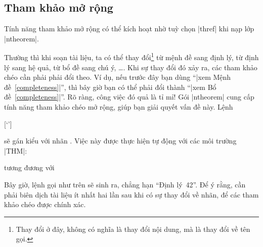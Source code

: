 \begin{theorem}
\begin{thm}
\subsection{Tham khảo mở rộng}

Tính năng tham khảo mở rộng có thể kích hoạt nhờ tuỳ chọn
|thref| khi nạp lớp |ntheorem|.

\medskip
Thường thì khi soạn tài liệu, ta có thể thay đổi\footnote{Thay đổi ở đây,
không có nghĩa là thay đổi nội dung, mà là thay đổi về tên gọi.}
từ mệnh đề
sang định lý, từ định lý sang hệ quả, từ bổ đề sang chú ý,
\ldots. Khi sự thay đổi đó xảy ra, các tham khảo chéo cần phải
phải đổi theo. Ví dụ, nếu trước đây bạn dùng 
``|xem Mệnh đề~\ref{completeness}|'', thì bây giờ bạn có thể phải đổi
thành ``|xem Bổ đề~\ref{completeness}|''. Rõ ràng, công việc đó
quả là tỉ mỉ! Gói |ntheorem| cung cấp tính năng
tham khảo chéo mở rộng, giúp bạn giải quyết vấn đề này.
Lệnh
\begin{command}
  \label{`\meta{label}'}[`']
\end{command}
sẽ gán kiểu  với nhãn .
Việc này được thực hiện tự động với các môi trường |THM|:
tương đương với

\medskip
\DescribeMacro\thref{}
\begin{command}
\end{command}
Bây giờ, lệnh gọi như trên sẽ sinh ra, chẳng hạn ``Định lý~42''.
Để ý rằng, cần phải biên dịch tài liệu ít nhất hai lần sau khi có
sự thay đổi về nhãn, để các tham khảo chéo được chính xác.


\end{thm}
\end{theorem}
